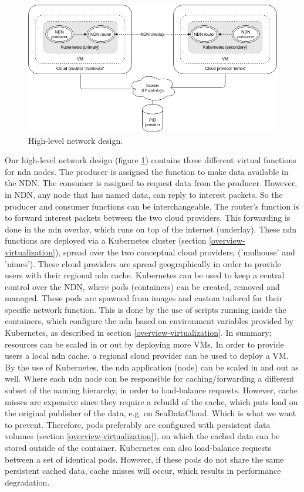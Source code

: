 \begin{figure}[H]
\centering
\includegraphics[width=\columnwidth]{Images/high-level-network-design.png}
\caption{High-level network design.}
\label{fig:high-level-network-design}
\end{figure}

Our high-level network design (figure \ref{fig:high-level-network-design}) contains three different virtual functions for \gls{ndn} nodes. The producer is assigned the function to make data available in the NDN. The consumer is assigned to request data from the producer. However, in NDN, any node that has named data, can reply to interest packets. So the producer and consumer functions can be interchangeable. The router's function is to forward interest packets between the two cloud providers. This forwarding is done in the \gls{ndn} overlay, which runs on top of the internet (underlay). These \gls{ndn} functions are deployed via a Kubernetes cluster (section \ref{overview-virtualization}), spread over the two conceptual cloud providers; ('mulhouse' and 'nimes'). These cloud providers are spread geographically in order to provide users with their regional \gls{ndn} cache. Kubernetes can be used to keep a central control over the NDN, where pods (containers) can be created, removed and managed. These pods are spawned from images and custom tailored for their specific network function. This is done by the use of scripts running inside the containers, which configure the \gls{ndn} based on environment variables provided by Kubernetes, as described in section \ref{overview-virtualization}. In summary; resources can be scaled in or out by deploying more VMs. In order to provide users a local \gls{ndn} cache, a regional cloud provider can be used to deploy a VM. By the use of Kubernetes, the \gls{ndn} application (node) can be scaled in and out as well. Where each \gls{ndn} node can be responsible for caching/forwarding a different subset of the naming hierarchy, in order to load-balance requests. However, cache misses are expensive since they require a rebuild of the cache, which puts load on the original publisher of the data, e.g. on SeaDataCloud. Which is what we want to prevent. Therefore, pods preferably are configured with persistent data volumes (section \ref{overview-virtualization}), on which the cached data can be stored outside of the container. Kubernetes can also load-balance requests between a set of identical pods. However, if these pods do not share the same persistent cached data, cache misses will occur, which results in performance degradation.


